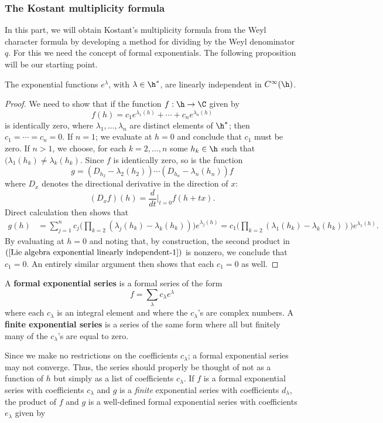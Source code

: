 \subsubsection{The Kostant multiplicity formula}
In this part, we will obtain Kostant's multiplicity formula from the Weyl character formula by developing a method for dividing by the Weyl denominator $q$. For this we need the concept of formal exponentials. The following proposition will be our starting point.
\begin{proposition}\label{Lie algebra exponential linearly independent}
The exponential functions $e^{\lambda}$, with $\lambda\in\h^*$, are linearly independent in $C^\infty(\h)$.
\end{proposition}
\begin{proof}
We need to show that if the function $f:\h\to\C$ given by
\[f(h)=c_1e^{\lambda_1(h)}+\cdots+c_ne^{\lambda_n(h)}\]
is identically zero, where $\lambda_1,\dots,\lambda_n$ are distinct elements of $\h^*$; then $c_1=\cdots=c_n=0$. If $n=1$; we evaluate at $h=0$ and conclude that $c_1$ must be zero. If $n>1$, we choose, for each $k=2,\dots,n$ some $h_k\in\h$ such that $(\lambda_1(h_k)\neq\lambda_k(h_k)$. Since $f$ is identically zero, so is the function
\[g=(D_{h_2}-\lambda_2(h_2))\cdots(D_{h_n}-\lambda_n(h_n))f\]
where $D_x$ denotes the directional derivative in the direction of $x$:
\[(D_xf)(h)=\frac{d}{dt}\Big|_{t=0}f(h+tx).\]
Direct calculation then shows that
\begin{align}\label{Lie algebra exponential linearly independent-1}
g(h)&=\sum_{j=1}^{n}c_j\Big(\prod_{k=2}(\lambda_j(h_k)-\lambda_k(h_k))\Big)e^{\lambda_j(h)}=c_1\Big(\prod_{k=2}(\lambda_1(h_k)-\lambda_k(h_k))\Big)e^{\lambda_1(h)}.
\end{align}
By evaluating at $h=0$ and noting that, by construction, the second product in $(\ref{Lie algebra exponential linearly independent-1})$ is nonzero, we conclude that $c_1=0$. An entirely similar argument then shows that each $c_1=0$ as well.
\end{proof}
\begin{definition}
A \textbf{formal exponential series} is a formal series of the form
\[f=\sum_\lambda c_\lambda e^{\lambda}\]
where each $c_\lambda$ is an integral element and where the $c_\lambda$'s are complex numbers. A \textbf{finite exponential series} is a series of the same form where all but finitely many of the $c_\lambda$'s are equal to zero.
\end{definition}
Since we make no restrictions on the coefficients $c_\lambda$; a formal exponential series may not converge. Thus, the series should properly be thought of not as a function of $h$ but simply as a list of coefficients $c_\lambda$. If $f$ is a formal exponential series with coefficients $c_\lambda$ and $g$ is a \textit{finite} exponential series with coefficients $d_\lambda$, the product of $f$ and $g$ is a well-defined formal exponential series with coefficients $e_\lambda$ given by
